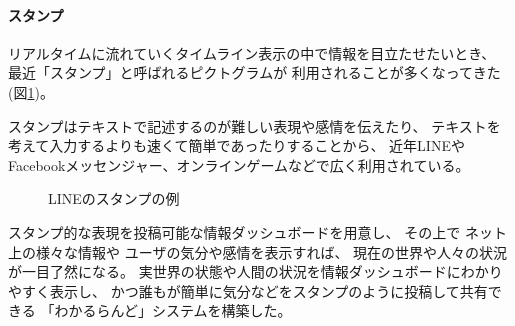 \vspace{2mm}
\paragraph*{スタンプ}

リアルタイムに流れていくタイムライン表示の中で情報を目立たせたいとき、
最近「スタンプ」と呼ばれるピクトグラムが
利用されることが多くなってきた(図\ref{linestamp})。

スタンプはテキストで記述するのが難しい表現や感情を伝えたり、
テキストを考えて入力するよりも速くて簡単であったりすることから、
近年LINEやFacebookメッセンジャー、オンラインゲームなどで広く利用されている。

\begin{figure}[H]
\centering{}
\caption{LINEのスタンプの例}
\label{linestamp}
\end{figure}

スタンプ的な表現を投稿可能な情報ダッシュボードを用意し、
その上で
ネット上の様々な情報や
ユーザの気分や感情を表示すれば、
現在の世界や人々の状況が一目了然になる。
%
実世界の状態や人間の状況を情報ダッシュボードにわかりやすく表示し、
かつ誰もが簡単に気分などをスタンプのように投稿して共有できる
「わかるらんど」システムを構築した。





